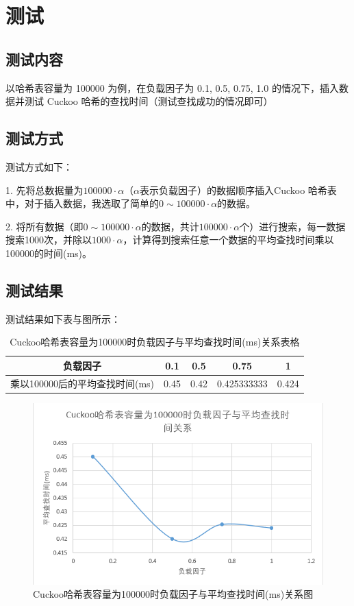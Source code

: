 \documentclass[UTF8]{ctexart}
\begin{document}
\section{测试}
\subsection{测试内容}
以哈希表容量为 100000 为例，在负载因子为 0.1, 0.5, 0.75, 1.0 的情况下，插入数据并测试 Cuckoo 哈希的查找时间（测试查找成功的情况即可）

\subsection{测试方式}
测试方式如下：

1. 先将总数据量为$100000 \cdot \alpha$（$\alpha$表示负载因子）的数据顺序插入Cuckoo 哈希表中，对于插入数据，我选取了简单的$0 \sim 100000 \cdot \alpha$的数据。

2. 将所有数据（即$0 \sim 100000 \cdot \alpha$的数据，共计$100000 \cdot \alpha$个）进行搜索，每一数据搜索1000次，并除以$1000 \cdot \alpha$，计算得到搜索任意一个数据的平均查找时间乘以100000的时间(ms)。

\subsection{测试结果}
测试结果如下表与图所示：

\begin{table}[H]
    \centering
    \begin{tabular}{|c|c|c|c|c|}
        \hline
        负载因子&	0.1&	0.5&	0.75&	1\\
        \hline
        乘以100000后的平均查找时间(ms)&	0.45&	0.42&	0.425333333&	0.424\\
        \hline
    \end{tabular}
    \caption{Cuckoo哈希表容量为100000时负载因子与平均查找时间(ms)关系表格}
\end{table}

\begin{figure}[H]
    \centering
    \includegraphics[scale=0.7]{T-alpha.png}
    \caption{Cuckoo哈希表容量为100000时负载因子与平均查找时间(ms)关系图}
\end{figure}
\end{document}
